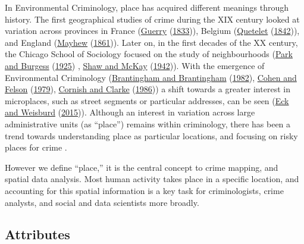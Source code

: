 \documentclass[
  krantz2]{krantz}
\begin{document}
In Environmental Criminology, place has acquired different meanings through history. The first geographical studies of crime during the XIX century looked at variation across provinces in France (\protect\hyperlink{ref-Guerry_1833}{Guerry} (\protect\hyperlink{ref-Guerry_1833}{1833})), Belgium (\protect\hyperlink{ref-Quetelet_1842}{Quetelet} (\protect\hyperlink{ref-Quetelet_1842}{1842})), and England (\protect\hyperlink{ref-Mayhew_1861}{Mayhew} (\protect\hyperlink{ref-Mayhew_1861}{1861})). Later on, in the first decades of the XX century, the Chicago School of Sociology focused on the study of neighbourhoods (\protect\hyperlink{ref-Park_1925}{Park and Burgess} (\protect\hyperlink{ref-Park_1925}{1925}) , \protect\hyperlink{ref-Shaw_1942}{Shaw and McKay} (\protect\hyperlink{ref-Shaw_1942}{1942})). With the emergence of Environmental Criminology (\protect\hyperlink{ref-Brantingham_1982}{Brantingham and Brantingham} (\protect\hyperlink{ref-Brantingham_1982}{1982}), \protect\hyperlink{ref-Cohen_1979}{Cohen and Felson} (\protect\hyperlink{ref-Cohen_1979}{1979}), \protect\hyperlink{ref-Cornish_1986}{Cornish and Clarke} (\protect\hyperlink{ref-Cornish_1986}{1986})) a shift towards a greater interest in microplaces, such as street segments or particular addresses, can be seen (\protect\hyperlink{ref-Eck_2015}{Eck and Weisburd} (\protect\hyperlink{ref-Eck_2015}{2015})). Although an interest in variation across large administrative units (as ``place'') remains within criminology, there has been a trend towards understanding place as particular locations, and focusing on risky places for crime .

However we define ``place,'' it is the central concept to crime mapping, and spatial data analysis. Most human activity takes place in a specific location, and accounting for this spatial information is a key task for criminologists, crime analysts, and social and data scientists more broadly.

\hypertarget{attributes}{%
\subsection{Attributes}\label{attributes}}
\end{document}
